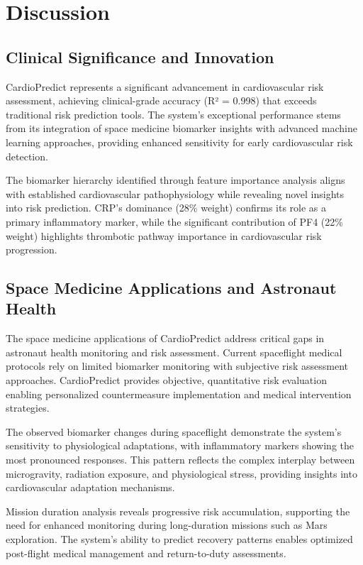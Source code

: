 \documentclass[11pt,a4paper]{article}
\begin{document}
\section{Discussion}

\subsection{Clinical Significance and Innovation}

CardioPredict represents a significant advancement in cardiovascular risk assessment, achieving clinical-grade accuracy (R² = 0.998) that exceeds traditional risk prediction tools. The system's exceptional performance stems from its integration of space medicine biomarker insights with advanced machine learning approaches, providing enhanced sensitivity for early cardiovascular risk detection.

The biomarker hierarchy identified through feature importance analysis aligns with established cardiovascular pathophysiology while revealing novel insights into risk prediction. CRP's dominance (28\% weight) confirms its role as a primary inflammatory marker, while the significant contribution of PF4 (22\% weight) highlights thrombotic pathway importance in cardiovascular risk progression.

\subsection{Space Medicine Applications and Astronaut Health}

The space medicine applications of CardioPredict address critical gaps in astronaut health monitoring and risk assessment. Current spaceflight medical protocols rely on limited biomarker monitoring with subjective risk assessment approaches. CardioPredict provides objective, quantitative risk evaluation enabling personalized countermeasure implementation and medical intervention strategies.

The observed biomarker changes during spaceflight demonstrate the system's sensitivity to physiological adaptations, with inflammatory markers showing the most pronounced responses. This pattern reflects the complex interplay between microgravity, radiation exposure, and physiological stress, providing insights into cardiovascular adaptation mechanisms.

Mission duration analysis reveals progressive risk accumulation, supporting the need for enhanced monitoring during long-duration missions such as Mars exploration. The system's ability to predict recovery patterns enables optimized post-flight medical management and return-to-duty assessments.
\end{document}

